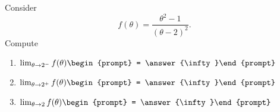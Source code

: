 \documentclass{ximera}
\author{Bart Snapp}
\begin{document}
\begin{exercise}
Consider 
\[
f(\theta) = \frac{\theta ^2-1}{(\theta -2)^2}.
\]
Compute
\begin{enumerate}
\item $\lim_{\theta\to 2^- } f(\theta) \begin{prompt} = \answer{\infty}\end{prompt}$
\item $\lim_{\theta\to 2^+ } f(\theta) \begin{prompt} = \answer{\infty}\end{prompt}$
\item $\lim_{\theta\to 2 } f(\theta) \begin{prompt} = \answer{\infty}\end{prompt}$
\end{enumerate}
\end{exercise}
\end{document}
